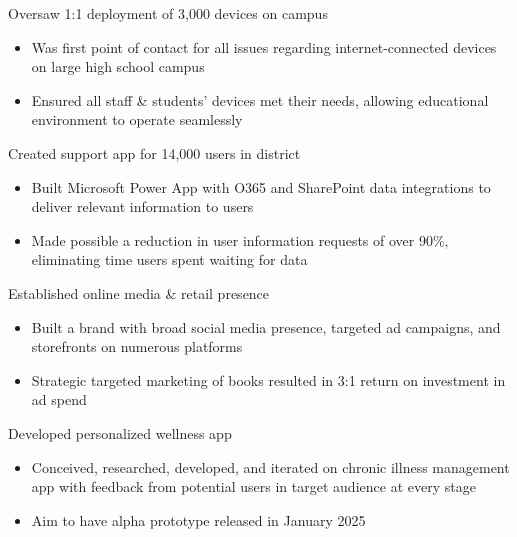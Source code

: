 \par\bigskip
{}
\par\smallskip
\begin{minipage}{13.75cm}
  \begin{minipage}{6.5cm}
    Oversaw 1:1 deployment of 3,000 devices on campus
    \begin{itemize}
      \item Was first point of contact for all issues regarding internet-connected devices on large high school campus
      \item Ensured all staff \& students' devices met their needs, allowing educational environment to operate seamlessly
    \end{itemize}
  \end{minipage}
  \hfill
  \begin{minipage}{6.5cm}
    Created support app for 14,000 users in district
    \begin{itemize}
      \item Built Microsoft Power App with O365 and SharePoint data integrations to deliver relevant information to users
      \item Made possible a reduction in user information requests of over 90\%, eliminating time users spent waiting for data
    \end{itemize}
  \end{minipage}
\end{minipage}
\par\smallskip
\divider

\par\smallskip
\begin{minipage}{13.75cm}
  \begin{minipage}{6.5cm}
    Established online media \& retail presence
    \begin{itemize}
      \item Built a brand with broad social media presence, targeted ad campaigns, and storefronts on numerous platforms
      \item Strategic targeted marketing of books resulted in 3:1 return on investment in ad spend
    \end{itemize}
  \end{minipage}
  \hfill
  \begin{minipage}{6.5cm}
    Developed personalized wellness app
    \begin{itemize}
      \item Conceived, researched, developed, and iterated on chronic illness management app with feedback from potential users in target audience at every stage
      \item Aim to have alpha prototype released in January 2025
    \end{itemize}
  \end{minipage}
\end{minipage}
\par\smallskip
\divider

